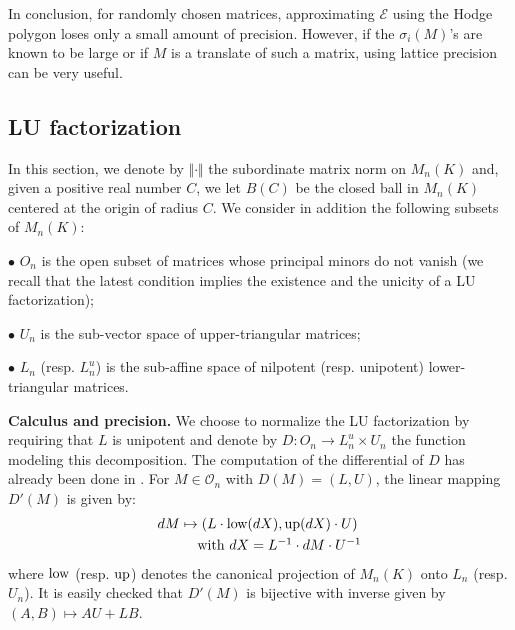 \documentclass{sig-alternate}
\renewcommand{\O}{\mathcal O}
\newcommand{\low}{\text{\rm low}}
\newcommand{\up}{\text{\rm up}}
\begin{document}
In conclusion, for randomly chosen matrices, approximating $\mathcal{E}$ 
using the Hodge polygon loses only a small amount of precision. However,
if the $\sigma_i(M)$'s are known to be large or if $M$ is a translate of
such a matrix, using lattice precision can be very useful.

\subsection{LU factorization}

In this section, we denote by $\Vert \cdot \Vert$ the subordinate matrix norm on $M_n(K)$
and, given a positive real number $C$, we let $B(C)$ be the closed ball 
in $M_n(K)$ centered at the origin of radius $C$. We consider in addition
the following subsets of $M_n(K)$:

\noindent $\bullet$
$O_n$ is the open subset of matrices whose principal 
minors do not vanish (we recall that the latest condition implies the
existence and the unicity of a LU factorization);

\noindent $\bullet$
$U_n$ is the sub-vector space of upper-triangular 
matrices;

\noindent $\bullet$
$L_n$ (resp. $L_n^u$) is the sub-affine space of 
nilpotent (resp. unipotent) lower-triangular matrices.

\smallskip

\noindent
{\bf Calculus and precision.}
We choose to normalize the LU factorization by requiring that $L$ is 
unipotent and denote by $D : O_n \to L_n^u \times U_n$ the function 
modeling this decomposition. The computation of the differential of $D$ 
has already been done in \cite[Appendix B]{caruso-roe-vaccon:14a}. For
$M \in \O_n$ with $D(M) = (L,U)$, the linear mapping $D'(M)$ is given 
by:
$$\begin{array}{l}
dM \mapsto (L \cdot \low(dX), \up(dX) \cdot U) \smallskip \\
\hspace{1cm}\text{with } dX = L^{-1} \cdot dM \cdot U^{-1}
\end{array}$$
where $\low$ (resp. $\up$) denotes the canonical projection of $M_n(K)$ 
onto $L_n$ (resp. $U_n$). 
It is easily checked that $D'(M)$ is bijective with inverse given by
$(A,B) \mapsto AU+LB$.
\end{document}
